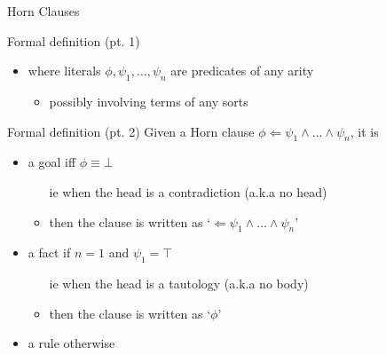 \documentclass[presentation]{beamer}\mode<presentation>{\usetheme{AMSBolognaFC}}
\begin{document}
\begin{frame}[allowframebreaks]{Horn Clauses}
\begin{block}{Formal definition (pt. 1)}
\begin{itemize}
\begin{itemize}
            \end{itemize}
            \item where literals $\phi, \psi_1, \ldots, \psi_n$ are \alert{predicates} of any arity
            \begin{itemize}
                \item possibly involving terms of any sorts
            \end{itemize}
        \end{itemize}
    \end{block}
    \begin{block}{Formal definition (pt. 2)}
        Given a Horn clause $\phi \Leftarrow \psi_1 \wedge \ldots \wedge \psi_n$, it is
        \begin{itemize}
            \item a \alert{goal} iff $\phi \equiv \bot$
            \begin{itemize}
                \item[ie] when the head is a contradiction (a.k.a no head)
                \item then the clause is written as `$\Leftarrow \psi_1 \wedge \ldots \wedge \psi_n$'
            \end{itemize}

            \item a \alert{fact} if $n = 1$ and $\psi_1 = \top$
            \begin{itemize}
                \item[ie] when the head is a tautology (a.k.a no body)
                \item then the clause is written as `$\phi$'
            \end{itemize}

            \item a \alert{rule} otherwise
        \end{itemize}
    \end{block}
\end{frame}
\end{document}
